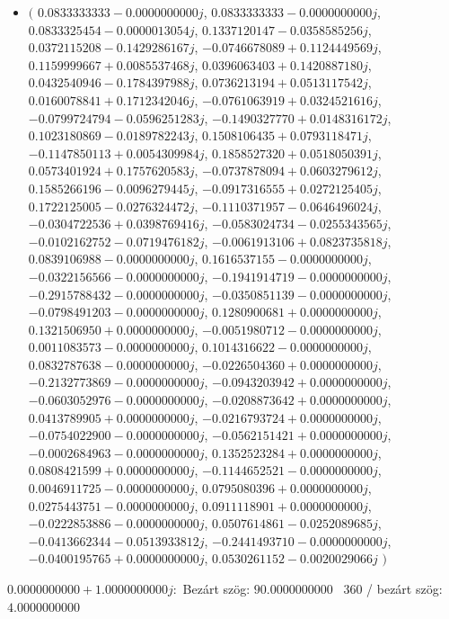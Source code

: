 \documentclass[14pt,a4paper]{article}
\begin{document}
\begin{itemize}
\item
$\big($
$0.0833333333-0.0000000000j$, $0.0833333333-0.0000000000j$, $0.0833325454-0.0000013054j$, $0.1337120147-0.0358585256j$, $0.0372115208-0.1429286167j$, $-0.0746678089+0.1124449569j$, $0.1159999667+0.0085537468j$, $0.0396063403+0.1420887180j$, $0.0432540946-0.1784397988j$, $0.0736213194+0.0513117542j$, $0.0160078841+0.1712342046j$, $-0.0761063919+0.0324521616j$, $-0.0799724794-0.0596251283j$, $-0.1490327770+0.0148316172j$, $0.1023180869-0.0189782243j$, $0.1508106435+0.0793118471j$, $-0.1147850113+0.0054309984j$, $0.1858527320+0.0518050391j$, $0.0573401924+0.1757620583j$, $-0.0737878094+0.0603279612j$, $0.1585266196-0.0096279445j$, $-0.0917316555+0.0272125405j$, $0.1722125005-0.0276324472j$, $-0.1110371957-0.0646496024j$, $-0.0304722536+0.0398769416j$, $-0.0583024734-0.0255343565j$, $-0.0102162752-0.0719476182j$, $-0.0061913106+0.0823735818j$, $0.0839106988-0.0000000000j$, $0.1616537155-0.0000000000j$, $-0.0322156566-0.0000000000j$, $-0.1941914719-0.0000000000j$, $-0.2915788432-0.0000000000j$, $-0.0350851139-0.0000000000j$, $-0.0798491203-0.0000000000j$, $0.1280900681+0.0000000000j$, $0.1321506950+0.0000000000j$, $-0.0051980712-0.0000000000j$, $0.0011083573-0.0000000000j$, $0.1014316622-0.0000000000j$, $0.0832787638-0.0000000000j$, $-0.0226504360+0.0000000000j$, $-0.2132773869-0.0000000000j$, $-0.0943203942+0.0000000000j$, $-0.0603052976-0.0000000000j$, $-0.0208873642+0.0000000000j$, $0.0413789905+0.0000000000j$, $-0.0216793724+0.0000000000j$, $-0.0754022900-0.0000000000j$, $-0.0562151421+0.0000000000j$, $-0.0002684963-0.0000000000j$, $0.1352523284+0.0000000000j$, $0.0808421599+0.0000000000j$, $-0.1144652521-0.0000000000j$, $0.0046911725-0.0000000000j$, $0.0795080396+0.0000000000j$, $0.0275443751-0.0000000000j$, $0.0911118901+0.0000000000j$, $-0.0222853886-0.0000000000j$, $0.0507614861-0.0252089685j$, $-0.0413662344-0.0513933812j$, $-0.2441493710-0.0000000000j$, $-0.0400195765+0.0000000000j$, $0.0530261152-0.0020029066j$
$\big)$
\end{itemize}
$0.0000000000+1.0000000000j$:\
Bezárt szög: $90.0000000000$ \
360 / bezárt szög: $4.0000000000$\
\end{document}
